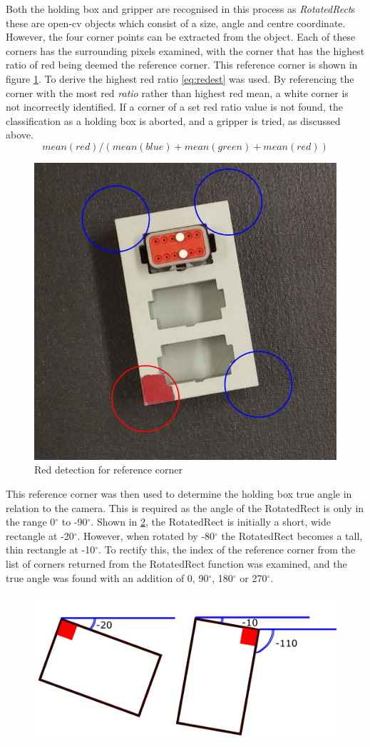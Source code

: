 \documentclass[11pt,a4paper]{report}
\begin{document}
Both the holding box and gripper are recognised in this process as \mbox{\textit{RotatedRect}s} these are open-cv objects which consist of a size, angle and centre coordinate. However, the four corner points can be extracted from the object. Each of these corners has the surrounding pixels examined, with the corner that has the highest ratio of red being deemed the reference corner. This reference corner is shown in figure \cref{fig:Redest}. To derive the highest red ratio \cref{eq:redest} was used. By referencing the corner with the most red \textit{ratio} rather than highest red mean, a white corner is not incorrectly identified. If a corner of a set red ratio value is not found, the classification as a holding box is aborted, and a gripper is tried, as discussed above.
\begin{equation}
mean(red)/(mean(blue)+mean(green)+mean(red))
\label{eq:redest}
\end{equation}
\begin{figure}[h]
	\centering
	\includegraphics[width=0.5\linewidth]{Redest}
	\caption{Red detection for reference corner}
	\label{fig:Redest}\end{figure}
This reference corner was then used to determine the holding box true angle in relation to the camera. This is required as the angle of the RotatedRect is only in the range 0$^{\circ}$ to -90$^{\circ}$. Shown in  \cref{fig:angleissue}, the RotatedRect is initially a short, wide rectangle at -20$^{\circ}$. However, when rotated by -80$^{\circ}$ the RotatedRect becomes a tall, thin rectangle at -10$^{\circ}$. To rectify this, the index of the reference corner from the list of corners returned from the RotatedRect function was examined, and the true angle was found with an addition of 0, 90$^{\circ}$, 180$^{\circ}$ or 270$^{\circ}$. 

\begin{figure}[h]
\centering
\includegraphics[width=0.7\linewidth]{"angle issue"}
\caption{}
\label{fig:angleissue}
\end{figure}
\end{document}
